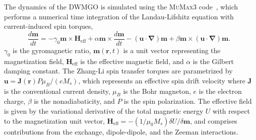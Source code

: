 \documentclass[aip,reprint,amsmath,amssymb,floatfix,superscriptaddress]{revtex4-1}
\begin{document}
The dynamics of the DWMGO is simulated using the \textsc{MuMax3} code~\cite{Vansteenkiste:2014et}, which performs a numerical time integration of the Landau-Lifshitz equation with current-induced spin torques,
%
\begin{equation}
\frac{d \mathbf{m}}{dt} = -\gamma_0 \mathbf{m} \times \mathbf{H}_\mathrm{eff} + \alpha \mathbf{m} \times \frac{d \mathbf{m}}{dt} - \left(\mathbf{u}\cdot\mathbf{\nabla}\right)\mathbf{m}+ \beta \mathbf{m} \times \left(\mathbf{u}\cdot\mathbf{\nabla}\right)\mathbf{m}.
\label{eq:LLG}
\end{equation}
%
$\gamma_0$ is the gyromagnetic ratio, $\mathbf{m}(\mathbf{r},t)$ is a unit vector representing the magnetization field, $\mathbf{H}_\mathrm{eff}$ is the effective magnetic field, and $\alpha$ is the Gilbert damping constant. The Zhang-Li spin transfer torques are parametrized by $\mathbf{u} = \mathbf{J}(\mathbf{r}) P \mu_B/ (e M_s)$, which represents an effective spin drift velocity where $\mathbf{J}$ is the conventional current density, $\mu_B$ is the Bohr magneton, $e$ is the electron charge, $\beta$ is the nonadiabaticity, and $P$ is the spin polarization. The effective field is given by the variational derivative of the total magnetic energy $U$ with respect to the magnetization unit vector, $\mathbf{H}_\mathrm{eff} = - (1/\mu_0 M_s) \delta U/\delta \mathbf{m}$, and comprises contributions from the exchange, dipole-dipole, and the Zeeman interactions.
\end{document}
